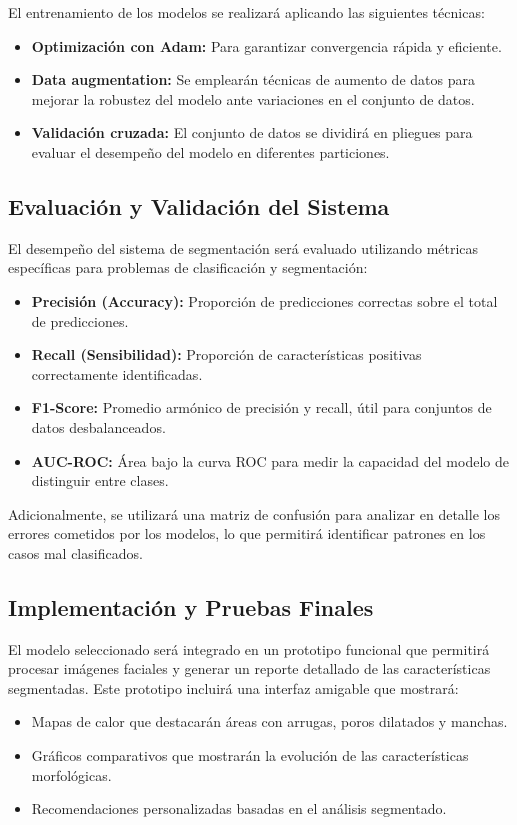 El entrenamiento de los modelos se realizará aplicando las siguientes técnicas:
\begin{itemize}
    \item \textbf{Optimización con Adam:} Para garantizar convergencia rápida y eficiente.
    \item \textbf{Data augmentation:} Se emplearán técnicas de aumento de datos para mejorar la robustez del modelo ante variaciones en el conjunto de datos.
    \item \textbf{Validación cruzada:} El conjunto de datos se dividirá en pliegues para evaluar el desempeño del modelo en diferentes particiones.
\end{itemize}

\subsection{Evaluación y Validación del Sistema}
El desempeño del sistema de segmentación será evaluado utilizando métricas específicas para problemas de clasificación y segmentación:
\begin{itemize}
    \item \textbf{Precisión (Accuracy):} Proporción de predicciones correctas sobre el total de predicciones.
    \item \textbf{Recall (Sensibilidad):} Proporción de características positivas correctamente identificadas.
    \item \textbf{F1-Score:} Promedio armónico de precisión y recall, útil para conjuntos de datos desbalanceados.
    \item \textbf{AUC-ROC:} Área bajo la curva ROC para medir la capacidad del modelo de distinguir entre clases.
\end{itemize}

Adicionalmente, se utilizará una matriz de confusión para analizar en detalle los errores cometidos por los modelos, lo que permitirá identificar patrones en los casos mal clasificados.

\subsection{Implementación y Pruebas Finales}
El modelo seleccionado será integrado en un prototipo funcional que permitirá procesar imágenes faciales y generar un reporte detallado de las características segmentadas. Este prototipo incluirá una interfaz amigable que mostrará:
\begin{itemize}
    \item Mapas de calor que destacarán áreas con arrugas, poros dilatados y manchas.
    \item Gráficos comparativos que mostrarán la evolución de las características morfológicas.
    \item Recomendaciones personalizadas basadas en el análisis segmentado.
\end{itemize}

